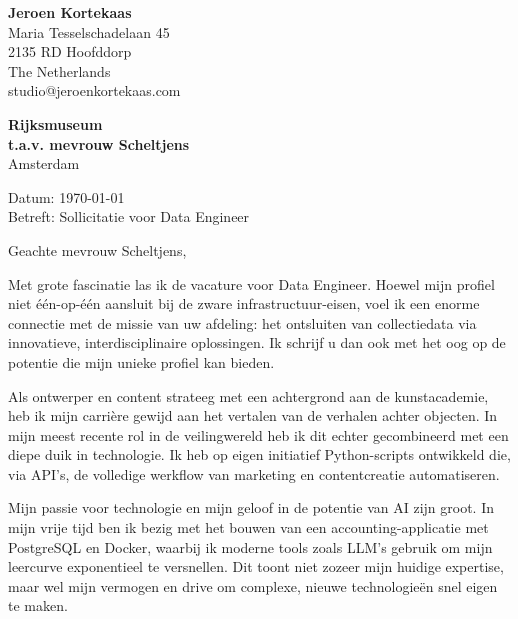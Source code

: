 \documentclass[10pt,a4paper]{article}
\begin{document}
\fontsize{9}{15}\selectfont

\noindent
\hfill
\begin{minipage}[t]{0.5\textwidth}
\raggedleft
\textbf{Jeroen Kortekaas} \\
Maria Tesselschadelaan 45 \\
2135 RD Hoofddorp \\
The Netherlands \\
studio@jeroenkortekaas.com \\
\end{minipage}

\vspace{1.5em}

\begin{adjustwidth}{15mm}{15mm}

\textbf{Rijksmuseum} \\
\textbf{t.a.v. mevrouw Scheltjens} \\
Amsterdam \\

\vspace{1.5em}

Datum: \today \\
Betreft: Sollicitatie voor Data Engineer \\

\vspace{1.5em}

Geachte mevrouw Scheltjens,

Met grote fascinatie las ik de vacature voor Data Engineer. Hoewel mijn profiel niet één-op-één aansluit bij de zware infrastructuur-eisen, voel ik een enorme connectie met de missie van uw afdeling: het ontsluiten van collectiedata via innovatieve, interdisciplinaire oplossingen. Ik schrijf u dan ook met het oog op de potentie die mijn unieke profiel kan bieden.

Als ontwerper en content strateeg met een achtergrond aan de kunstacademie, heb ik mijn carrière gewijd aan het vertalen van de verhalen achter objecten. In mijn meest recente rol in de veilingwereld heb ik dit echter gecombineerd met een diepe duik in technologie. Ik heb op eigen initiatief Python-scripts ontwikkeld die, via API's, de volledige werkflow van marketing en contentcreatie automatiseren.

Mijn passie voor technologie en mijn geloof in de potentie van AI zijn groot. In mijn vrije tijd ben ik bezig met het bouwen van een accounting-applicatie met PostgreSQL en Docker, waarbij ik moderne tools zoals LLM's gebruik om mijn leercurve exponentieel te versnellen. Dit toont niet zozeer mijn huidige expertise, maar wel mijn vermogen en drive om complexe, nieuwe technologieën snel eigen te maken.


\end{adjustwidth}
\end{document}
